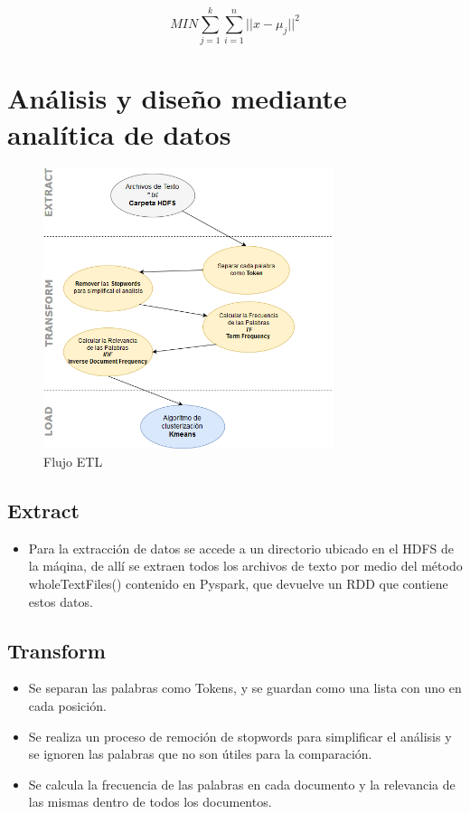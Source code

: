 \documentclass[fleqn,10pt]{SelfArx} %
\begin{document}
\begin{equation}
MIN \sum_{j=1}^{k} \sum_{i=1}^{n} \lvert \lvert x-\mu_j \lvert \lvert^{2}  
\label{eq:refname2}
\end{equation}

\section{Análisis y diseño mediante analítica de datos}

\begin{figure}[ht]\centering
\includegraphics[width=85mm,]{ETL}
\caption{Flujo ETL}
\label{fig:tabla1}
\end{figure}
\subsection{Extract}
\begin{itemize}
\item Para la extracción de datos se accede a un directorio ubicado en el HDFS de la máqina, de allí se extraen todos los archivos de texto por medio del método wholeTextFiles() contenido en Pyspark, que devuelve un RDD que contiene estos datos.
\end{itemize}
\subsection{Transform}

\begin{itemize}
  \item Se separan las palabras como Tokens, y se guardan como una lista con uno en cada posición.
  \item Se realiza un proceso de remoción de stopwords para simplificar el análisis y se ignoren las palabras que no son útiles para la comparación.
  \item Se calcula la frecuencia de las palabras en cada documento y la relevancia de las mismas dentro de todos los documentos.
\end{itemize}
\end{document}
